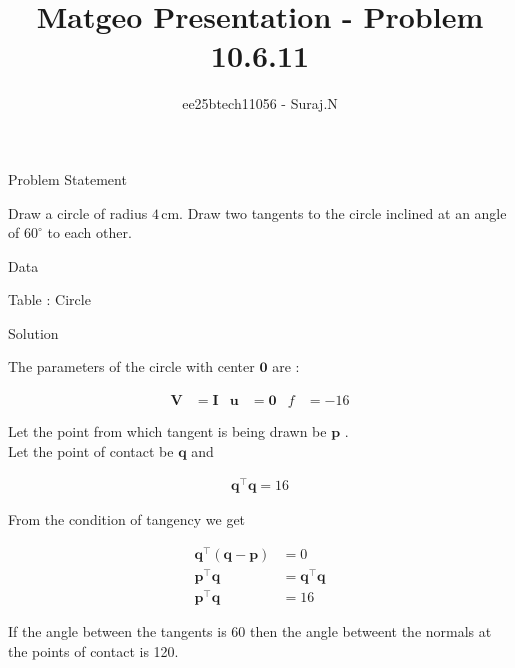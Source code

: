 \documentclass{beamer}
\title{Matgeo Presentation - Problem 10.6.11}
\author{ee25btech11056 - Suraj.N}
\numberwithin{equation}{section}
\theoremstyle{remark}
\let\vec\mathbf
\begin{document}
\begin{frame}
  \titlepage
\end{frame}

\begin{frame}{Problem Statement}

Draw a circle of radius $4\,$cm. Draw two tangents to the circle inclined at an angle of $60^\circ$ to each other.

\end{frame}

\begin{frame}{Data}

\begin{table}[h!]
  \centering
  
  \caption*{Table : Circle}
  \label{10.6.11}
\end{table}

\end{frame}

\begin{frame}{Solution}

The parameters of the circle with center $\vec{0}$ are :

\begin{align}
  \vec{V} &= \vec{I} & \vec{u} &= \vec{0} & f &= -16
\end{align}

Let the point from which tangent is being drawn be $\vec{p}$ .\\

Let the point of contact be $\vec{q}$ and 

\begin{align}
\vec{q}^\top\vec{q} = 16 
\end{align}

From the condition of tangency we get 

\begin{align}
  \vec{q}^\top(\vec{q}-\vec{p}) &= 0\\
  \vec{p}^\top\vec{q} &= \vec{q}^\top\vec{q}\\
  \vec{p}^\top\vec{q} &= 16 \label{eq:pq} 
\end{align}

If the angle between the tangents is 60{\degree} then the angle betweent the normals at the points of contact is 120{\degree}.\\

\end{frame}
\end{document}
